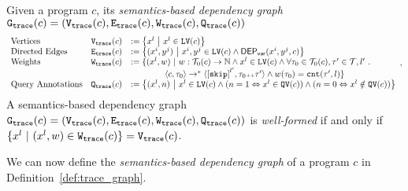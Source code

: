\begin{defn}
  \label{def:trace_graph}
  Given a program ${c}$,
  its \emph{semantics-based dependency graph} 
  $\mathtt{{G_{trace}}}({c}) = (\mathtt{{V_{trace}}}({c}), \mathtt{{E_{trace}}}({c}), \mathtt{{W_{trace}}}({c}), \mathtt{{Q_{trace}}}({c}))$ 
  {\small
  \[
  \begin{array}{lll}
    \text{Vertices} &
    \traceV({c}) & := \left\{ 
    x^l
    ~ \middle\vert ~ x^l \in \lvar(c)
    \right\}
    \\
    \text{Directed Edges} &
    \traceE({c}) & := 
    \left\{ 
    (x^i, y^j) 
    ~ \middle\vert ~
    x^i, y^j \in \lvar(c) \land \vardep(x^i, y^j, c) 
    \right\}
    \\
    \text{Weights} &
    \traceW({c}) & := 
    \{ 
    (x^l, w) 
    ~ \vert ~ 
    w : \tdom_0(c) \to \mathbb{N}
    \land
    x^l \in \lvar(c) \land
    \forall \trace_0 \in \tdom_0(c), \trace' \in \tdom, l' \st
    \\ & & \qquad \qquad
    \config{{c}, \trace_0} \to^{*} 
    \config{\clabel{\eskip}^{l'}, \trace_0 \tracecat \trace'} 
    \land w(\trace_0) = \vcounter(\trace', l) \} 
     \\
    \text{Query Annotations} &
    \traceF({c}) & := 
  \left\{(x^l, n)  
  ~ \middle\vert ~
   x^l \in \lvar(c) \land
  (n = 1 \Leftrightarrow x^l \in \qvar(c))\land ( n = 0 \Leftrightarrow  x^l \notin \qvar(c))
  \right\}
  \end{array},
  \]
  A semantics-based dependency graph $\mathtt{{G_{trace}}}({c})= (\mathtt{{V_{trace}}}({c}), \mathtt{{E_{trace}}}({c}), \mathtt{{W_{trace}}}({c}), \mathtt{{Q_{trace}}}({c}))$ is \emph{well-formed} if and only if $ \{x^l \ |\ (x^l,w)\in \mathtt{{W_{trace}}}({c})\} = \mathtt{{V_{trace}}}({c}) $.
  }
  \end{defn}
We can now define the \emph{semantics-based dependency graph} of a program $c$ in Definition~\ref{def:trace_graph}.
